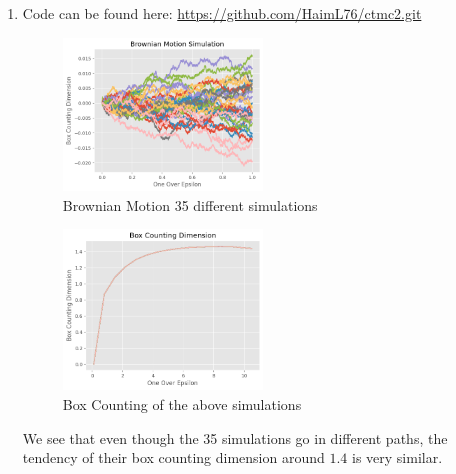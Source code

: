 \documentclass{article}
\begin{document}
\begin{enumerate}
\item Code can be found here: \url{https://github.com/HaimL76/ctmc2.git}

\begin{figure}[h]
\caption{Brownian Motion 35 different simulations}
\centering
\includegraphics[width=0.5\textwidth]{brownian_motion_simulation.png}
\end{figure}
\begin{figure}[h]
\caption{Box Counting of the above simulations}
\centering
\includegraphics[width=0.5\textwidth]{box_counting_dimensions.png}
\end{figure}
We see that even though the 35 simulations go in different paths, the tendency of their box counting dimension around $1.4$ is very similar.


\end{enumerate}
\end{document}
